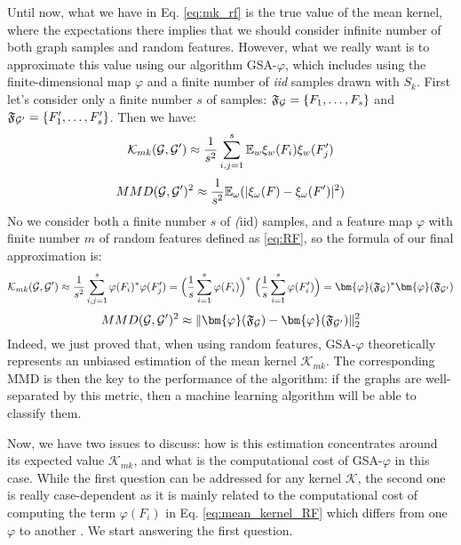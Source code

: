 Until now, what we have in Eq. \ref{eq:mk_rf} is the true value of the mean kernel, where the expectations there implies that we should consider infinite number of both graph samples and random features. However, what we really want is to approximate this value using our algorithm GSA-$\varphi$, which includes  using the finite-dimensional map $\varphi$ and a finite number of \emph{iid} samples drawn with $S_k$. First let's consider only a finite number $s$ of samples: $\mathfrak{F}_{\mathcal{G}}=\{F_1, \ldots, F_s\}$ and $\mathfrak{F}_{\mathcal{G}'}=\{F'_1, \ldots, F'_s\}$. Then we have: 
\begin{equation}
\label{eq:MK_samples}
\mathcal{K}_{mk}(\mathcal{G},\mathcal{G}') \approx \frac{1}{s^2} \sum_{i,j=1}^s \mathbb{E}_w \xi_w(F_i)\xi_w(F'_j)
\end{equation}
\[
MMD(\mathcal{G},\mathcal{G}')^2 \approx \frac{1}{s^2}\mathbb{E}_{\omega} ( | \xi_\omega(F) -\xi_\omega(F') |^2 )
\]
No we consider both a finite number $s$ of \emph(iid) samples, and a feature map $\varphi$ with finite number $m$ of random features defined as \eqref{eq:RF}, so the formula of our final approximation is:
\begin{equation}
\label{eq:mean_kernel_RF}
\mathcal{K}_{mk}(\G,\G') \approx \frac{1}{s^2} \sum_{i,j=1}^s \varphi(F_i)^*\varphi(F_j')=\Big(\frac{1}{s}\sum_{i=1}^s\varphi(F_i)\Big)^*~\Big(\frac{1}{s}\sum_{i=1}^s\varphi(F_i')\Big) = \bm{\varphi}(\mathfrak{F}_{\G})^* \bm{\varphi}(\mathfrak{F}_{\G'})
\end{equation}
\[
MMD(\G,\G')^2 \approx  \| \bm{\varphi}(\mathfrak{F}_{\G}) - \bm{\varphi}(\mathfrak{F}_{\G'}) \|_2^2 
\]
Indeed, we just proved that, when using random features, GSA-$\varphi$ theoretically represents an unbiased estimation of the mean kernel $\mathcal{K}_{mk}$. The corresponding MMD is then the key to the performance of the algorithm: if the graphs are well-separated by this metric, then a machine learning algorithm will be able to classify them.

Now, we have two issues to discuss: how is this estimation concentrates around its expected value $\mathcal{K}_{mk}$, and what is the computational cost of GSA-$\varphi$ in this case. While the first question can be addressed for any kernel $\mathcal{K}$, the second one is really case-dependent as it is mainly related to the computational cost of computing the term $\varphi(F_i)$ in Eq. \eqref{eq:mean_kernel_RF} which differs from one $\varphi$ to another . We start answering the first question.


